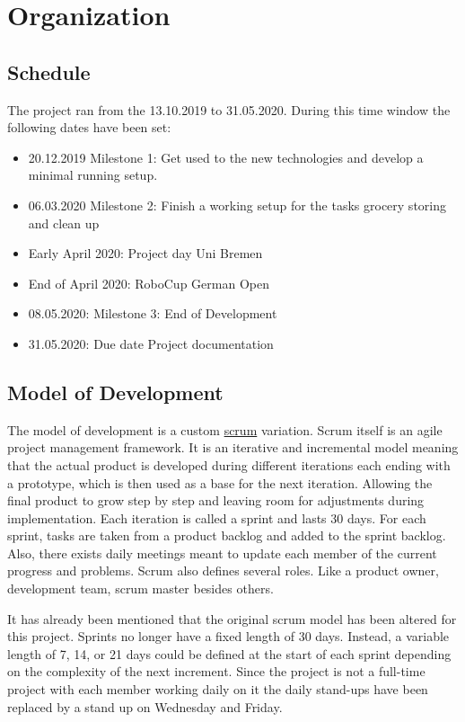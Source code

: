 \documentclass[main.tex]{subfiles}
\begin{document}
	\chapter{Organization}
	\label{organisation}
	
	\section{Schedule}
	The project ran from the 13.10.2019 to 31.05.2020. During this time window the following dates have been set:
	\begin{itemize}
		\item 20.12.2019 Milestone 1: Get used to the new technologies and develop a minimal running setup.
		\item 06.03.2020 Milestone 2: Finish a working setup for the tasks grocery storing and clean up
		\item Early April 2020: Project day Uni Bremen
		\item End of April 2020: RoboCup German Open
		\item 08.05.2020: Milestone 3: End of Development
		\item 31.05.2020: Due date Project documentation
	\end{itemize} 

	\section{Model of Development}
	\label{sec:modelofdevelopment}
	The model of development is a custom \href{http://projektmanagement-definitionen.de/glossar/scrum/}{scrum} variation. Scrum itself is an agile project management framework. It is an iterative and incremental model meaning that the actual product is developed during different iterations each ending with a prototype, which is then used as a base for the next iteration. Allowing the final product to grow step by step and leaving room for adjustments during implementation. Each iteration is called a sprint and lasts 30 days. For each sprint, tasks are taken from a product backlog and added to the sprint backlog. Also, there exists daily meetings meant to update each member of the current progress and problems. Scrum also defines several roles. Like a product owner, development team, scrum master besides others.  
	
	It has already been mentioned that the original scrum model has been altered for this project. Sprints no longer have a fixed length of 30 days. Instead, a variable length of 7, 14, or 21 days could be defined at the start of each sprint depending on the complexity of the next increment. Since the project is not a full-time project with each member working daily on it the daily stand-ups have been replaced by a stand up on Wednesday and Friday. 
	
\end{document}
